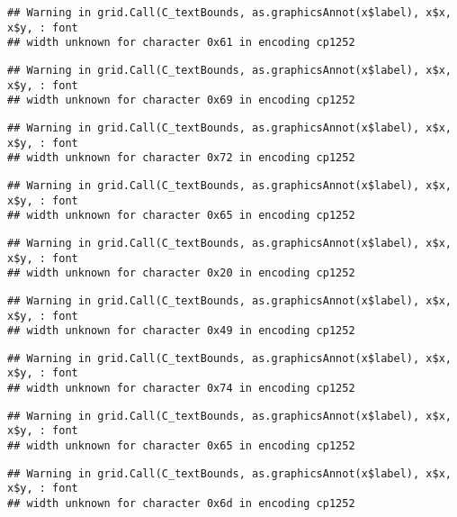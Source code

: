 \documentclass[
]{article}
\begin{document}
\begin{verbatim}
## Warning in grid.Call(C_textBounds, as.graphicsAnnot(x$label), x$x, x$y, : font
## width unknown for character 0x61 in encoding cp1252
\end{verbatim}

\begin{verbatim}
## Warning in grid.Call(C_textBounds, as.graphicsAnnot(x$label), x$x, x$y, : font
## width unknown for character 0x69 in encoding cp1252
\end{verbatim}

\begin{verbatim}
## Warning in grid.Call(C_textBounds, as.graphicsAnnot(x$label), x$x, x$y, : font
## width unknown for character 0x72 in encoding cp1252
\end{verbatim}

\begin{verbatim}
## Warning in grid.Call(C_textBounds, as.graphicsAnnot(x$label), x$x, x$y, : font
## width unknown for character 0x65 in encoding cp1252
\end{verbatim}

\begin{verbatim}
## Warning in grid.Call(C_textBounds, as.graphicsAnnot(x$label), x$x, x$y, : font
## width unknown for character 0x20 in encoding cp1252
\end{verbatim}

\begin{verbatim}
## Warning in grid.Call(C_textBounds, as.graphicsAnnot(x$label), x$x, x$y, : font
## width unknown for character 0x49 in encoding cp1252
\end{verbatim}

\begin{verbatim}
## Warning in grid.Call(C_textBounds, as.graphicsAnnot(x$label), x$x, x$y, : font
## width unknown for character 0x74 in encoding cp1252
\end{verbatim}

\begin{verbatim}
## Warning in grid.Call(C_textBounds, as.graphicsAnnot(x$label), x$x, x$y, : font
## width unknown for character 0x65 in encoding cp1252
\end{verbatim}

\begin{verbatim}
## Warning in grid.Call(C_textBounds, as.graphicsAnnot(x$label), x$x, x$y, : font
## width unknown for character 0x6d in encoding cp1252
\end{verbatim}
\end{document}
